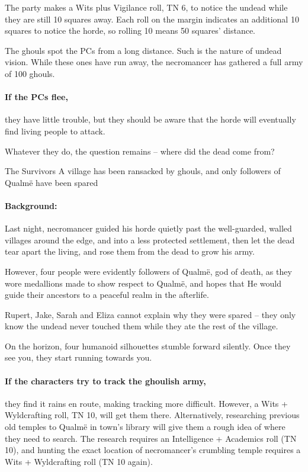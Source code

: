 \begin{multicols}{2}
\begin{boxtext}
\end{boxtext}

The party makes a Wits plus Vigilance roll, TN 6, to notice the undead while they are still 10 squares away.
Each roll on the margin indicates an additional 10 squares to notice the horde, so rolling 10 means 50 squares' distance.

The ghouls spot the PCs from a long distance.
Such is the nature of undead vision.%
\iftoggle{core}%
  {See the core rules, page \pageref{undead}.}
  {}
While these ones have run away, the necromancer has gathered a full army of 100 ghouls.

\paragraph{If the PCs flee,}
they have little trouble, but they should be aware that the horde will eventually find living people to attack.

Whatever they do, the question remains -- where did the dead come from?

{The Survivors}%
{A village has been ransacked by ghouls, and only followers of Qualm\"{e} have been spared}%

\paragraph{Background:}
Last night, \gls{necromancer} guided his horde quietly past the well-guarded, walled villages around the \gls{edge}, and into a less protected settlement, then let the dead tear apart the living, and rose them from the dead to grow his army.

However, four people were evidently followers of Qualm\"{e}, god of death, as they wore medallions made to show respect to Qualm\"{e}, and hopes that He would guide their ancestors to a peaceful realm in the afterlife.

Rupert, Jake, Sarah and Eliza cannot explain why they were spared -- they only know the undead never touched them while they ate the rest of the village.

\begin{boxtext}

  On the horizon, four humanoid silhouettes stumble forward silently.  Once they see you, they start running towards you.

\end{boxtext}

\paragraph{If the characters try to track the ghoulish army,}
they find it rains en route, making tracking more difficult.
However, a Wits + Wyldcrafting roll, TN 10, will get them there.
Alternatively, researching previous old temples to Qualm\"{e} in \gls{town}'s library will give them a rough idea of where they need to search.
The research requires an Intelligence + Academics roll (TN 10), and hunting the exact location of \gls{necromancer}'s crumbling temple requires a Wits + Wyldcrafting roll (TN 10 again).


\end{multicols}
